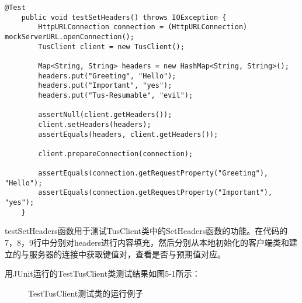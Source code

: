 \documentclass[bachelor]{thesis-uestc}
\begin{document}
\begin{lstlisting}[title=testSetHeaders测试函数]
    @Test
    public void testSetHeaders() throws IOException {
        HttpURLConnection connection = (HttpURLConnection) mockServerURL.openConnection();
        TusClient client = new TusClient();

        Map<String, String> headers = new HashMap<String, String>();
        headers.put("Greeting", "Hello");
        headers.put("Important", "yes");
        headers.put("Tus-Resumable", "evil");

        assertNull(client.getHeaders());
        client.setHeaders(headers);
        assertEquals(headers, client.getHeaders());

        client.prepareConnection(connection);

        assertEquals(connection.getRequestProperty("Greeting"), "Hello");
        assertEquals(connection.getRequestProperty("Important"), "yes");
    }
\end{lstlisting}
\par testSetHeaders函数用于测试TusClient类中的SetHeaders函数的功能。在代码的7，8，9行中分别对headers进行内容填充，然后分别从本地初始化的客户端类和建立的与服务器的连接中获取键值对，查看是否与预期值对应。
\par 用JUnit运行的TestTusClient类测试结果如图5-1所示：
\begin{figure}[h]
\caption{TestTusClient测试类的运行例子}
\end{figure}
\end{document}
